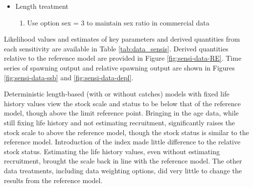 \documentclass[11pt,
  english,
  a4paper,
]{article}
\begin{document}
\begin{itemize}
  \tagstructend
\item

  Length treatment

  \tagmcend\tagstructend\tagstructend


  \begin{enumerate}
  \def\labelenumi{\arabic{enumi}.}
  \setcounter{enumi}{11}
  \item


    Use option sex = 3 to maintain sex ratio in commercial data

    \tagmcend\tagstructend\tagstructend

    \tagmcend\tagstructend\tagstructend
  \end{enumerate}

  \tagstructend
\end{itemize}

\tagstructend


Likelihood values and estimates of key parameters and derived quantities from each sensitivity are available in Table \ref{tab:data_sensis}. Derived quantities relative to the reference model are provided in Figure \ref{fig:sensi-data-RE}. Time series of spawning output and relative spawning output are shown in Figures \ref{fig:sensi-data-ssb} and \ref{fig:sensi-data-depl}.

\leavevmode\tagmcend\tagstructend\par


Deterministic length-based (with or without catches) models with fixed life history values view the stock scale and status to be below that of the reference model, though above the limit reference point. Bringing in the age data, while still fixing life history and not estimating recruitment, significantly raises the stock scale to above the reference model, though the stock status is similar to the reference model. Introduction of the index made little difference to the relative stock status. Estimating the life history values, even without estimating recruitment, brought the scale back in line with the reference model. The other data treatments, including data weighting options, did very little to change the results from the reference model.
\end{document}
